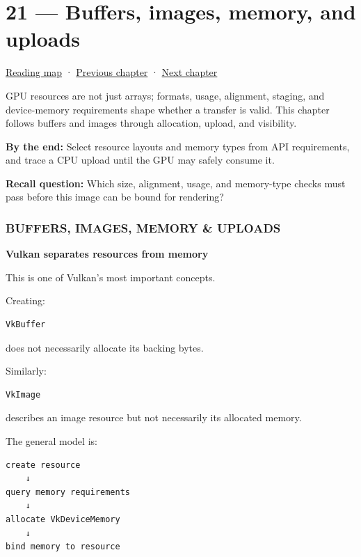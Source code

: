 \hypertarget{05-engine-i-ch021}{}
\chapter{21 --- Buffers, images, memory, and uploads}\label{05-engine-i-ch021-buffers-images-memory-and-uploads}

\hyperref[volume-reading-map]{Reading map} · \hyperref[05-engine-i-ch020-gpu-performance-models-and-principled-redesign]{Previous chapter} · \hyperref[05-engine-i-ch022-vulkan-synchronization-and-multi-frame-lifetimes]{Next chapter}

GPU resources are not just arrays; formats, usage, alignment, staging, and device-memory requirements shape whether a transfer is valid. This chapter follows buffers and images through allocation, upload, and visibility.

\textbf{By the end:} Select resource layouts and memory types from API requirements, and trace a CPU upload until the GPU may safely consume it.

\textbf{Recall question:} Which size, alignment, usage, and memory-type checks must pass before this image can be bound for rendering?

\subsection{BUFFERS, IMAGES, MEMORY \& UPLOADS}\label{05-engine-i-ch021-buffers-images-memory-uploads}

\textbf{Vulkan separates resources from memory}

This is one of Vulkan's most important concepts.

Creating:

\begin{verbatim}
VkBuffer
\end{verbatim}

does not necessarily allocate its backing bytes.

Similarly:

\begin{verbatim}
VkImage
\end{verbatim}

describes an image resource but not necessarily its allocated memory.

The general model is:

\begin{verbatim}
create resource
    ↓
query memory requirements
    ↓
allocate VkDeviceMemory
    ↓
bind memory to resource
\end{verbatim}

